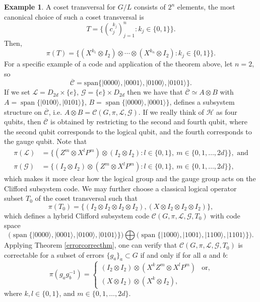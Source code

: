 \documentclass[11pt]{article}
\theoremstyle{definition}
\newtheorem{example}{Example}
\def\ket#1{| #1 \rangle}
\newcommand{\calC}{\mathcal{C}}
\newcommand{\calG}{\mathcal{G}}
\newcommand{\calH}{\mathcal{H}}
\newcommand{\calL}{\mathcal{L}}
\newcommand{\Span}{\operatorname{span}}
\begin{document}
\begin{example}
    A coset transversal for $G / L$ consists of $2^n$ elements, the most canonical choice of such a coset transversal is
    \[
        T = \{ (c_j^{k_j})_{j = 1}^{n} : k_j \in \{0,1\}\}.
    \]
    Then,
    \[
        \pi(T) = \{ (X^{k_1} \otimes I_2) \otimes \cdots \otimes (X^{k_n} \otimes I_2) : k_j \in \{0,1\}\}.
    \]
    For a specific example of a code and application of the theorem above, let $n=2$, so 
    \[
        \overline{\calC} = \mathrm{span}\{ \ket{0000}, \ket{0001}, \ket{0100}, \ket{0101}  \}.
    \]
    If we set $\calL = D_{2d} \times \{e\}$, $\calG = \{e\} \times D_{2d}$ then we have that $\overline{\calC} \simeq A \otimes B$ with $A = \Span\{\ket{0100}, \ket{0101}\}$, $B = \Span\{\ket{0000}, \ket{0001}\}$, defines a subsystem structure on $\overline{\calC}$, i.e. $A \otimes B = \calC(G,\pi,\calL,\calG)$. If we really think of $\calH$ as four qubits, then $\overline{\calC}$ is obtained by restricting to the second and fourth qubit, where the second qubit corresponds to the logical qubit, and the fourth corresponds to the gauge qubit. Note that
    \begin{align*}
        \pi(\calL) & = \{ (Z^m \otimes X^lP^m)\otimes(I_2 \otimes I_2) : l \in \{0,1\}, \ m \in \{0,1,\ldots,2d\} \}, \text{ and} \\
        \pi(\calG) & = \{ (I_2 \otimes I_2)\otimes(Z^m \otimes X^lP^m) : l \in \{0,1\}, \ m \in \{0,1,\ldots,2d\} \},
    \end{align*}
    which makes it more clear how the logical group and the gauge group acts on the Clifford subsystem code. We may further choose a classical logical operator subset $T_0$ of the coset transversal such that
    \[
        \pi(T_0) = \{(I_2 \otimes I_2 \otimes I_2 \otimes I_2), (X \otimes I_2 \otimes I_2 \otimes I_2)\},
    \]
    which defines a hybrid Clifford subsystem code $\calC(G,\pi,\calL,\calG,T_0)$ with code space
    \[
        \bigg(\Span\{\ket{0000}, \ket{0001}, \ket{0100}, \ket{0101}\}\bigg) \bigoplus \bigg(\Span\{\ket{1000}, \ket{1001}, \ket{1100}, \ket{1101}\}\bigg).
    \]
    Applying Theorem \ref{errorcorrecthm}, one can verify that $\calC(G,\pi,\calL,\calG,T_0)$ is correctable for a subset of errors $\{g_a\}_a \subset G$ if and only if for all $a$ and $b$: 
    \[
        \pi(g_ag_b^{-1}) = 
        \begin{cases}
            (I_2 \otimes I_2) \otimes (X^{k}Z^m \otimes X^lP^m) & \text{or}, \\
            (X \otimes I_2) \otimes (X^{k} \otimes I_2), &
        \end{cases}
    \]
    where $k, l \in \{0,1\}$, and $m \in \{0,1,\ldots,2d\}$.
\end{example} 
\end{document}
